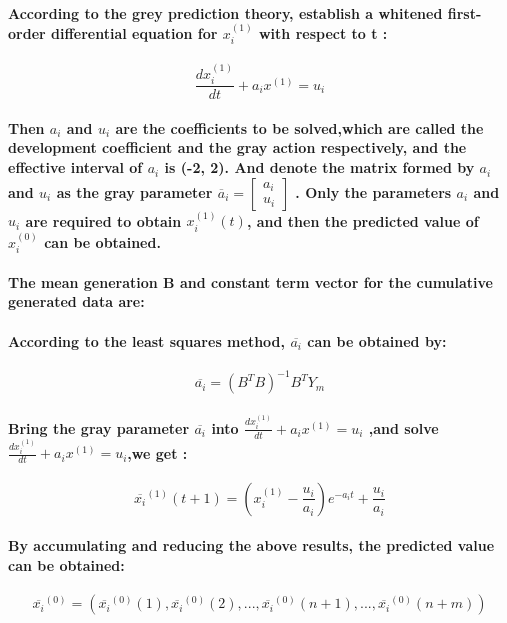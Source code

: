 \documentclass{mcmthesis}
\begin{document}
	\paragraph{According to the grey prediction theory, establish a whitened first-order differential equation for $x^{(1)}_{i}$ with respect to t :}
	\begin{equation}
		\frac{dx^{(1)}_{i}}{dt}+a_{i}x^{(1)}=u_{i}
	\end{equation}
	\paragraph{Then $a_{i}$ and $u_{i}$ are the coefficients to be solved,which are called the development coefficient and the gray action respectively, and the effective interval of $a_{i}$ is (-2, 2).
		And denote the matrix formed by $a_{i}$ and $u_{i}$ as the gray parameter $\overline a_{i} = \begin{bmatrix}a_{i} \\ u_{i}\end{bmatrix}$ . Only the parameters $a_{i}$ and $u_{i}$  are required to obtain $x^{(1)}_{i}(t)$, and then the predicted value of $x^{(0)}_{i}$ can be obtained.  }
	\paragraph{The mean generation B and constant term vector for the cumulative generated data are: }
	\paragraph{According to the least squares method, $\overline{a_{i}}$ can be obtained by: }
	\begin{equation}
		\overline{a_{i}} = (B^{T}B)^{-1}B^{T}Y_{m} 
	\end{equation}
	\paragraph{Bring the gray parameter $\overline{a_{i}}$ into $\frac{dx^{(1)}_{i}}{dt}+a_{i}x^{(1)}=u_{i}$ ,and solve $\frac{dx^{(1)}_{i}}{dt}+a_{i}x^{(1)}=u_{i}$,we get :}
	\begin{equation}
		\overline{x_{i}}^{(1)}(t+1)=(x_{i}^{(1)}-\frac{u_{i}}{a_{i}})e^{-a_{i}t}+\frac{u_{i}}{a_{i}}
	\end{equation}
	\paragraph{By accumulating and reducing the above results, the predicted value can be obtained: }
	\begin{equation}
		\overline{x_{i}}^{(0)} = (\overline{x_{i}}^{(0)}(1),\overline{x_{i}}^{(0)}(2),...,\overline{x_{i}}^{(0)}(n+1),...,\overline{x_{i}}^{(0)}(n+m))
	\end{equation}
\end{document}

